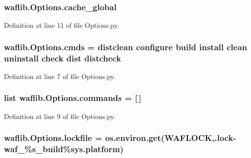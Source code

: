 \subsubsection[{\texorpdfstring{cache\+\_\+global}{cache_global}}]{\setlength{\rightskip}{0pt plus 5cm}waflib.\+Options.\+cache\+\_\+global}\hypertarget{namespacewaflib_1_1_options_ac881e7a851ac9fa37652fe9e6dc96064}{}\label{namespacewaflib_1_1_options_ac881e7a851ac9fa37652fe9e6dc96064}


Definition at line 11 of file Options.\+py.

\subsubsection[{\texorpdfstring{cmds}{cmds}}]{ waflib.\+Options.\+cmds = \textquotesingle{}distclean configure build install clean uninstall check dist distcheck\textquotesingle{}}\hypertarget{namespacewaflib_1_1_options_a5479000d2a6733789d312131d5986675}{}\label{namespacewaflib_1_1_options_a5479000d2a6733789d312131d5986675}


Definition at line 7 of file Options.\+py.

\subsubsection[{\texorpdfstring{commands}{commands}}]{\setlength{\rightskip}{0pt plus 5cm}list waflib.\+Options.\+commands = \mbox{[}$\,$\mbox{]}}\hypertarget{namespacewaflib_1_1_options_a22160f1b2c16a64ebaa7e03b7ce3a490}{}\label{namespacewaflib_1_1_options_a22160f1b2c16a64ebaa7e03b7ce3a490}


Definition at line 9 of file Options.\+py.

\subsubsection[{\texorpdfstring{lockfile}{lockfile}}]{\setlength{\rightskip}{0pt plus 5cm}waflib.\+Options.\+lockfile = os.\+environ.\+get(\textquotesingle{}W\+A\+F\+L\+O\+CK\textquotesingle{},\textquotesingle{}.lock-\/waf\+\_\+\%s\+\_\+build\textquotesingle{}\%sys.\+platform)}\hypertarget{namespacewaflib_1_1_options_a1a4644d17d5132ca20bece814d2725b5}{}\label{namespacewaflib_1_1_options_a1a4644d17d5132ca20bece814d2725b5}



